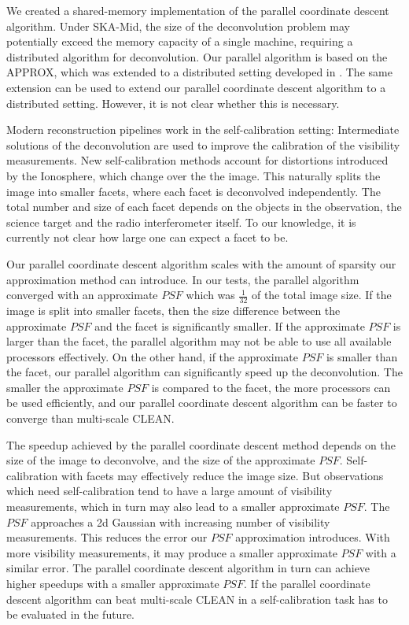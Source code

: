 We created a shared-memory implementation of the parallel coordinate descent algorithm. Under SKA-Mid, the size of the deconvolution problem may potentially exceed the memory capacity of a single machine, requiring a distributed algorithm for deconvolution. Our parallel algorithm is based on the APPROX\cite{fercoq2015accelerated}, which was extended to a distributed setting developed in \cite{fercoqfast}. The same extension can be used to extend our parallel coordinate descent algorithm to a distributed setting. However, it is not clear whether this is necessary.

Modern reconstruction pipelines work in the self-calibration setting: Intermediate solutions of the deconvolution are used to improve the calibration of the visibility measurements. New self-calibration methods account for distortions introduced by the Ionosphere, which change over the the image. This naturally splits the image into smaller facets, where each facet is deconvolved independently\cite{van2016lofar}. The total number and size of each facet depends on the objects in the observation, the science target and the radio interferometer itself. To our knowledge, it is currently not clear how large one can expect a facet to be.

Our parallel coordinate descent algorithm scales with the amount of sparsity our approximation method can introduce. In our tests, the parallel algorithm converged with an approximate $PSF$ which was $\frac{1}{32}$ of the total image size. If the image is split into smaller facets, then the size difference between the approximate $PSF$ and the facet is significantly smaller. If the approximate $PSF$ is larger than the facet, the parallel algorithm may not be able to use all available processors effectively. On the other hand, if the approximate $PSF$ is smaller than the facet, our parallel algorithm can significantly speed up the deconvolution. The smaller the approximate $PSF$ is compared to the facet, the more processors can be used efficiently, and our parallel coordinate descent algorithm can be faster to converge than multi-scale CLEAN.

The speedup achieved by the parallel coordinate descent method depends on the size of the image to deconvolve, and the size of the approximate $PSF$. Self-calibration with facets may effectively reduce the image size. But observations which need self-calibration tend to have a large amount of visibility measurements, which in turn may also lead to a smaller approximate $PSF$. The $PSF$ approaches a 2d Gaussian with increasing number of visibility measurements. This reduces the error our $PSF$ approximation introduces. With more visibility measurements, it may produce a smaller approximate $PSF$ with a similar error. The parallel coordinate descent algorithm in turn can achieve higher speedups with a smaller approximate $PSF$. If the parallel coordinate descent algorithm can beat multi-scale CLEAN in a self-calibration task has to be evaluated in the future.

